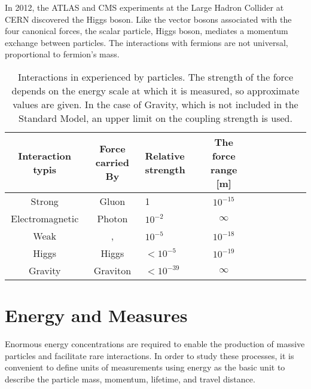 In 2012, the ATLAS and CMS experiments at the Large Hadron Collider at CERN discovered the Higgs boson. Like the vector bosons associated with the four canonical forces, the scalar particle, Higgs boson, mediates a momentum exchange between particles. The interactions with fermions are not universal, proportional to fermion's mass.

\begin{table}[htp]
\begin{center}
\caption{Interactions in experienced by particles. The strength of the force depends on the energy scale at which it is measured, so approximate values are given. In the case of Gravity, which is not included in the Standard Model, an upper limit on the coupling strength is used. \cite{robinson}}
{\normalsize
\begin{tabular}{c c l c c c c c c c}
\toprule
Interaction typis      & Force carried By &  Relative strength   & The force range [m]  \\
\midrule
Strong           & Gluon      &  1           & $10^{-15}$ \\
Electromagnetic  & Photon     &  $10^{-2}$   & $\infty$   \\
Weak             & \W, \Z     &  $10^{-5}$   & $10^{-18}$ \\
Higgs            & Higgs      &  $<10^{-5}$  & $10^{-19}$ \\
Gravity          & Graviton   &  $<10^{-39}$ & $\infty$   \\
\bottomrule
\end{tabular}
}
\label{tab:forces}
\end{center}
\end{table}

\section{Energy and Measures}

Enormous energy concentrations are required to enable the production of massive particles and facilitate rare interactions.
In order to study these processes, it is convenient to define units of measurements using energy as the basic unit to describe the particle mass, momentum, lifetime, and travel distance.

